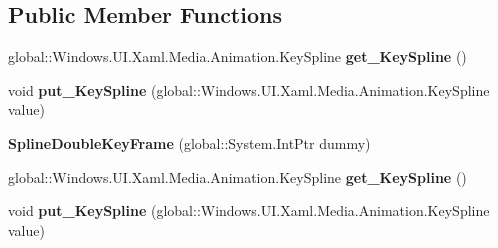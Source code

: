 \subsection*{Public Member Functions}
\begin{DoxyCompactItemize}
\item 
\mbox{\label{class_windows_1_1_u_i_1_1_xaml_1_1_media_1_1_animation_1_1_spline_double_key_frame_a284de7793c5aad4546113d30eb113e57}} 
global\+::\+Windows.\+U\+I.\+Xaml.\+Media.\+Animation.\+Key\+Spline {\bfseries get\+\_\+\+Key\+Spline} ()
\item 
\mbox{\label{class_windows_1_1_u_i_1_1_xaml_1_1_media_1_1_animation_1_1_spline_double_key_frame_a00a313d5fe9408d85eb21a8359970b9b}} 
void {\bfseries put\+\_\+\+Key\+Spline} (global\+::\+Windows.\+U\+I.\+Xaml.\+Media.\+Animation.\+Key\+Spline value)
\item 
\mbox{\label{class_windows_1_1_u_i_1_1_xaml_1_1_media_1_1_animation_1_1_spline_double_key_frame_a5682fdd40fc6dfc76492bfe4adbfd6ec}} 
{\bfseries Spline\+Double\+Key\+Frame} (global\+::\+System.\+Int\+Ptr dummy)
\item 
\mbox{\label{class_windows_1_1_u_i_1_1_xaml_1_1_media_1_1_animation_1_1_spline_double_key_frame_a284de7793c5aad4546113d30eb113e57}} 
global\+::\+Windows.\+U\+I.\+Xaml.\+Media.\+Animation.\+Key\+Spline {\bfseries get\+\_\+\+Key\+Spline} ()
\item 
\mbox{\label{class_windows_1_1_u_i_1_1_xaml_1_1_media_1_1_animation_1_1_spline_double_key_frame_a00a313d5fe9408d85eb21a8359970b9b}} 
void {\bfseries put\+\_\+\+Key\+Spline} (global\+::\+Windows.\+U\+I.\+Xaml.\+Media.\+Animation.\+Key\+Spline value)
\item 
\mbox{\label{class_windows_1_1_u_i_1_1_xaml_1_1_media_1_1_animation_1_1_spline_double_key_frame_a5682fdd40fc6dfc76492bfe4adbfd6ec}} 

\end{DoxyCompactItemize}
